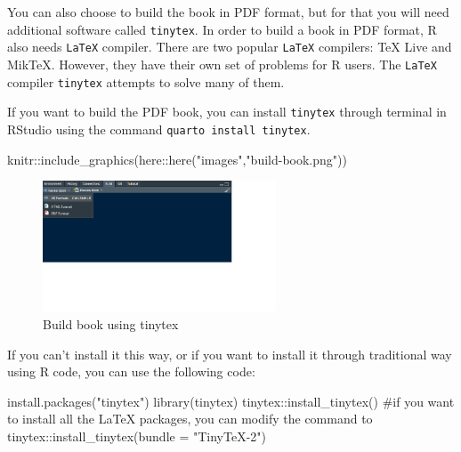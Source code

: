 \documentclass[
  letterpaper,
  paper =a4,
  twoside,
  openright,
  headsepline,
  footsepline,
  listof = totocnumbered,
  chapterprefix = true,
  firstiscover]{scrbook}
\newenvironment{Shaded}{\begin{snugshade}}{\end{snugshade}}
\newcommand{\CommentTok}[1]{\textcolor[rgb]{0.37,0.37,0.37}{#1}}
\newcommand{\FunctionTok}[1]{\textcolor[rgb]{0.28,0.35,0.67}{#1}}
\newcommand{\NormalTok}[1]{\textcolor[rgb]{0.00,0.23,0.31}{#1}}
\newcommand{\SpecialCharTok}[1]{\textcolor[rgb]{0.37,0.37,0.37}{#1}}
\newcommand{\StringTok}[1]{\textcolor[rgb]{0.13,0.47,0.30}{#1}}
\begin{document}
You can also choose to build the book in PDF format, but for that you
will need additional software called \texttt{tinytex}. In order to build
a book in PDF format, R also needs \texttt{LaTeX} compiler. There are
two popular \texttt{LaTeX} compilers: TeX Live and MikTeX. However, they
have their own set of problems for R users. The \texttt{LaTeX} compiler
\texttt{tinytex} attempts to solve many of them.

If you want to build the PDF book, you can install \texttt{tinytex}
through terminal in RStudio using the command
\texttt{quarto\ install\ tinytex}.

\begin{Shaded}
\begin{Highlighting}[numbers=left,,]
\NormalTok{knitr}\SpecialCharTok{::}\FunctionTok{include\_graphics}\NormalTok{(here}\SpecialCharTok{::}\FunctionTok{here}\NormalTok{(}\StringTok{"images"}\NormalTok{,}\StringTok{"build{-}book.png"}\NormalTok{))}
\end{Highlighting}
\end{Shaded}

\begin{figure}[H]

{\centering \includegraphics[width=2.73in,height=\textheight]{images/build-book.png}

}

\caption{\label{fig-build-book}Build book using tinytex}

\end{figure}

If you can't install it this way, or if you want to install it through
traditional way using R code, you can use the following code:

\begin{Shaded}
\begin{Highlighting}[numbers=left,,]
\FunctionTok{install.packages}\NormalTok{(}\StringTok{"tinytex"}\NormalTok{)}
\FunctionTok{library}\NormalTok{(tinytex)}
\NormalTok{tinytex}\SpecialCharTok{::}\FunctionTok{install\_tinytex}\NormalTok{()}
\CommentTok{\#if you want to install all the LaTeX packages, you can modify the command to tinytex::install\_tinytex(bundle = "TinyTeX{-}2")}
\end{Highlighting}
\end{Shaded}
\end{document}
